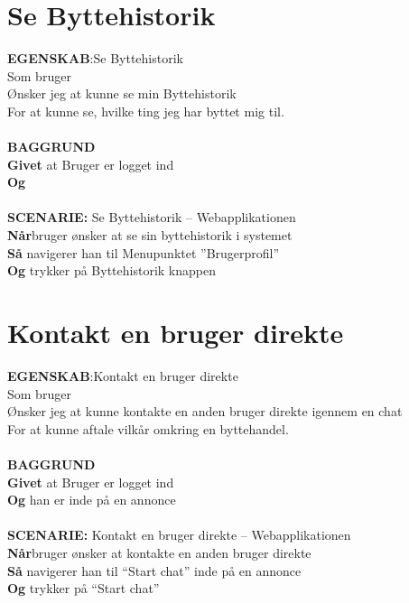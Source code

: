 \section{Se Byttehistorik}
{\color{blue}\textbf{EGENSKAB}:}Se Byttehistorik \\
Som bruger \\
Ønsker jeg at kunne se min Byttehistorik \\
For  at kunne se, hvilke ting jeg har byttet mig til.\\ \\
{\color{blue}\textbf{BAGGRUND}} \\
{\color{blue}\textbf{Givet}} at Bruger er logget ind \\
{\color{blue}\textbf{Og}} \\\\
{\color{blue}\textbf{SCENARIE:}} Se Byttehistorik – Webapplikationen \\
{\color{blue}\textbf{Når}}bruger ønsker at se sin byttehistorik i systemet\\
{\color{blue}\textbf{Så}} navigerer han til Menupunktet ”Brugerprofil” \\
{\color{blue}\textbf{Og}} trykker på Byttehistorik knappen

\section{Kontakt en bruger direkte}
{\color{blue}\textbf{EGENSKAB}:}Kontakt en bruger direkte \\
Som bruger \\
Ønsker jeg at kunne kontakte en anden bruger direkte igennem en chat \\
For at kunne aftale vilkår omkring en byttehandel.\\ \\
{\color{blue}\textbf{BAGGRUND}} \\
{\color{blue}\textbf{Givet}} at Bruger er logget ind \\
{\color{blue}\textbf{Og}} han er inde på en annonce\\\\
{\color{blue}\textbf{SCENARIE:}} Kontakt en bruger direkte – Webapplikationen \\
{\color{blue}\textbf{Når}}bruger ønsker at kontakte en anden bruger direkte\\
{\color{blue}\textbf{Så}} navigerer han til “Start chat” inde på en annonce \\
{\color{blue}\textbf{Og}} trykker på “Start chat”

